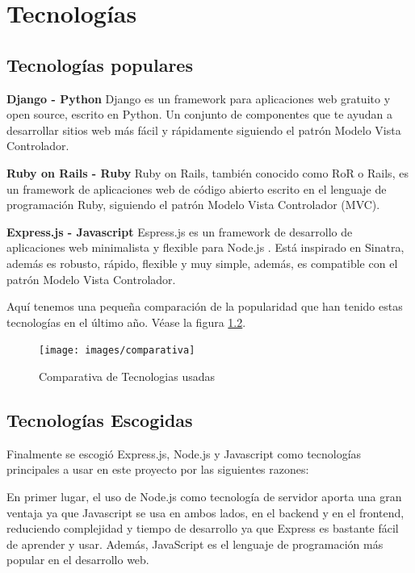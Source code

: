 
\section{Tecnologías}
\label{3:sec1}

\subsection{Tecnologías populares}
\label{3:1:1}
{\bf Django - Python}
Django es un framework para aplicaciones web gratuito y open source, escrito en Python. Un conjunto de componentes que te ayudan a desarrollar sitios web más fácil y rápidamente siguiendo el patrón Modelo Vista Controlador.

{\bf Ruby on Rails - Ruby}
Ruby on Rails, también conocido como RoR o Rails, es un framework de aplicaciones web de código abierto escrito en el lenguaje de programación Ruby, siguiendo el patrón Modelo Vista Controlador (MVC).

{\bf Express.js - Javascript}
Espress.js \cite{B6} es un framework de desarrollo de aplicaciones web minimalista y flexible para Node.js \cite{B1}. Está inspirado en Sinatra, además es robusto, rápido, flexible y muy simple, además, es compatible con el patrón Modelo Vista Controlador.

Aquí tenemos una pequeña comparación de la popularidad que han tenido estas tecnologías en el último año. Véase la figura \ref{3:1:2}.


\begin{figure}[!th]
\begin{center}
\texttt{[image: images/comparativa]}
\caption{Comparativa de Tecnologias usadas}
\label{fig:Comparativa de Tecnologias usadas}
\end{center}
\end{figure}
\subsection{Tecnologías Escogidas}
\label{3:1:2}

Finalmente se escogió Express.js, Node.js y Javascript como tecnologías principales a usar en este proyecto por las siguientes razones:

En primer lugar, el uso de Node.js como tecnología de servidor aporta una gran ventaja ya que Javascript se usa en ambos lados, en el backend y en el frontend, reduciendo complejidad y tiempo de desarrollo ya que Express es bastante fácil de aprender y usar. Además, JavaScript es el lenguaje de programación más popular en el desarrollo web.

